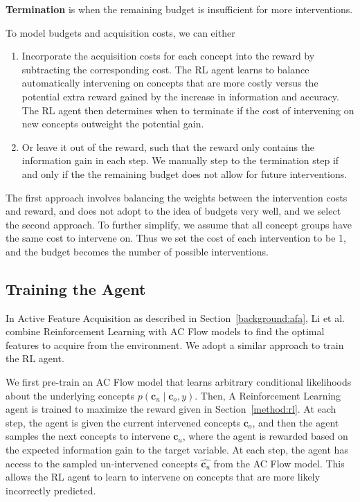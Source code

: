 \textbf{Termination} is when the remaining budget is insufficient for more interventions.
    

To model budgets and acquisition costs, we can either

\begin{enumerate}
    \item Incorporate the acquisition costs for each concept into the reward by subtracting
    the corresponding cost. The RL agent
    learns to balance automatically intervening on concepts that are more costly versus the
    potential extra reward gained by the increase in information and accuracy. The RL agent then determines when to terminate
    if the cost of intervening on new concepts outweight the potential gain.
    \item Or leave it out of the reward, such that
    the reward only contains the information gain in each step. 
    We manually step to the termination
    step if and only if the the remaining budget does not allow for future interventions.
    
\end{enumerate}

The first approach
involves balancing the weights between the intervention costs and reward, and does not 
adopt to the idea of budgets very well, and we select the second approach.
To further simplify, we assume that all concept groups have the same cost
to intervene on. Thus we set the cost of each intervention to be 1, and the budget
becomes the number of possible interventions.

\subsection{Training the Agent}

In Active Feature Acquisition as described in Section~\ref{background:afa},
Li et al.~\cite{afa} combine Reinforcement Learning with 
AC Flow models to find the optimal features to acquire 
from the environment. We
adopt a similar approach to train the RL agent.

We first pre-train an AC Flow model that learns 
arbitrary conditional likelihoods about the underlying
concepts $p(\mathbf{c}_u \mid \mathbf{c}_o, y)$. 
Then, A Reinforcement Learning agent is trained to maximize 
the reward given in Section~\ref{method:rl}. 
At each
step, the agent is given the current intervened concepts $\mathbf{c}_o$, 
and then the agent samples the next 
concepts to intervene $\mathbf{c}_u$, 
where the agent is rewarded based on the expected information gain
to the target variable.
At each step, the agent has access to the sampled un-intervened concepts $\hat{\mathbf{c}_u}$ 
from the AC Flow model. This allows the RL agent to learn to intervene on concepts that are 
more likely incorrectly predicted.

